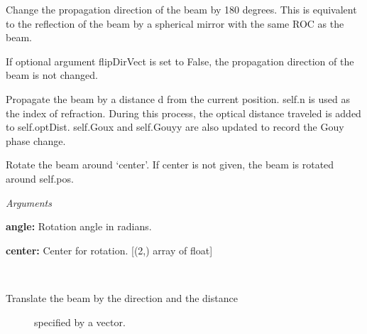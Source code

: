 \documentclass[letterpaper,10pt,english]{sphinxmanual}
\begin{document}
\begin{fulllineitems}
\begin{fulllineitems}
\label{api/gtrace:gtrace.beam.GaussianBeam.flip}
Change the propagation direction of the beam
by 180 degrees.
This is equivalent to the reflection of the beam
by a spherical mirror with the same ROC as the beam.

If optional argument flipDirVect is set to False,
the propagation direction of the beam is not changed.

\end{fulllineitems}


\begin{fulllineitems}
\label{api/gtrace:gtrace.beam.GaussianBeam.propagate}
Propagate the beam by a distance d from the current position.
self.n is used as the index of refraction.
During this process, the optical distance traveled is added
to self.optDist.
self.Goux and self.Gouyy are also updated to record the Gouy
phase change.

\end{fulllineitems}


\begin{fulllineitems}
\label{api/gtrace:gtrace.beam.GaussianBeam.rotate}
Rotate the beam around `center'.
If center is not given, the beam is rotated
around self.pos.

\emph{Arguments}

\textbf{angle:} Rotation angle in radians.

\textbf{center:} Center for rotation. {[}(2,) array of float{]}

\end{fulllineitems}


\begin{fulllineitems}
\label{api/gtrace:gtrace.beam.GaussianBeam.translate}~\begin{description}
\item[{Translate the beam by the direction and the distance}] \leavevmode
specified by a vector.


\end{description}
\end{fulllineitems}
\end{fulllineitems}
\end{document}
